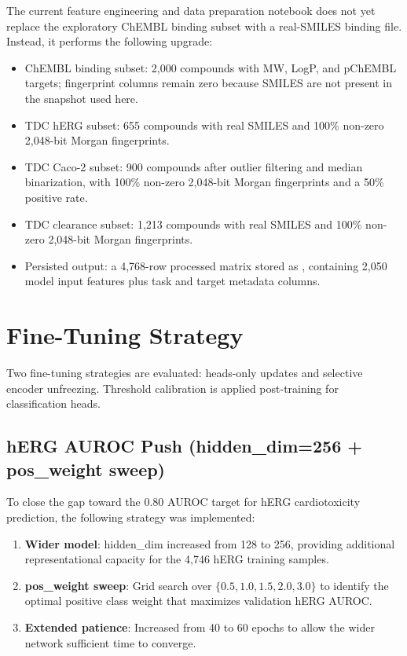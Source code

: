 \documentclass[a4paper,11pt,twoside]{report}
\begin{document}
The current feature engineering and data preparation notebook does not yet replace the exploratory ChEMBL binding subset with a real-SMILES binding file. Instead, it performs the following upgrade:
\begin{itemize}
  \item ChEMBL binding subset: 2,000 compounds with MW, LogP, and pChEMBL targets; fingerprint columns remain zero because SMILES are not present in the snapshot used here.
  \item TDC hERG subset: 655 compounds with real SMILES and 100\% non-zero 2,048-bit Morgan fingerprints.
  \item TDC Caco-2 subset: 900 compounds after outlier filtering and median binarization, with 100\% non-zero 2,048-bit Morgan fingerprints and a 50\% positive rate.
  \item TDC clearance subset: 1,213 compounds with real SMILES and 100\% non-zero 2,048-bit Morgan fingerprints.
  \item Persisted output: a 4,768-row processed matrix stored as , containing 2,050 model input features plus task and target metadata columns.
\end{itemize}

\section{Fine-Tuning Strategy}

Two fine-tuning strategies are evaluated: heads-only updates and selective encoder unfreezing. Threshold calibration is applied post-training for classification heads.

\subsection{hERG AUROC Push (hidden\_dim=256 + pos\_weight sweep)}

To close the gap toward the 0.80 AUROC target for hERG cardiotoxicity prediction, the following strategy was implemented:
\begin{enumerate}
  \item \textbf{Wider model}: hidden\_dim increased from 128 to 256, providing additional representational capacity for the 4,746 hERG training samples.
  \item \textbf{pos\_weight sweep}: Grid search over $\{0.5, 1.0, 1.5, 2.0, 3.0\}$ to identify the optimal positive class weight that maximizes validation hERG AUROC.
  \item \textbf{Extended patience}: Increased from 40 to 60 epochs to allow the wider network sufficient time to converge.
\end{enumerate}
\end{document}
